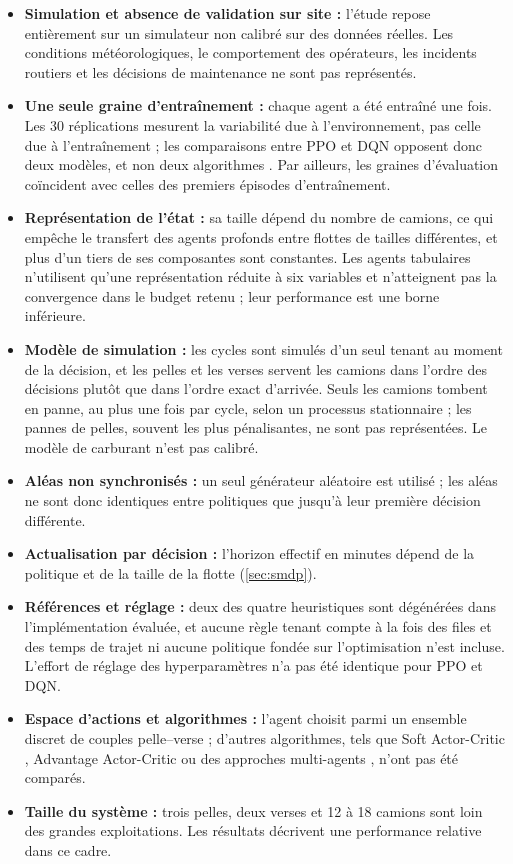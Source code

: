 \documentclass[11pt,a4paper]{article}
\newif\ifrevmarks
\newcommand{\revtag}[1]{\ifrevmarks\textsuperscript{\textcolor{red!70!black}{\scriptsize[#1]}}\fi}
\newenvironment{revbloc}[1]{\par\ifrevmarks\color{revcolor}\noindent\revtag{#1}\ \fi}{\par}
\begin{document}
\begin{revbloc}{M7, M8, M9, M11, M12, M25, N1--N5}
\begin{itemize}
  \item \textbf{Simulation et absence de validation sur site :} l'étude repose entièrement sur un simulateur non calibré sur des données réelles. Les conditions météorologiques, le comportement des opérateurs, les incidents routiers et les décisions de maintenance ne sont pas représentés.
  \item \textbf{Une seule graine d'entraînement :} chaque agent a été entraîné une fois. Les 30 réplications mesurent la variabilité due à l'environnement, pas celle due à l'entraînement ; les comparaisons entre PPO et DQN opposent donc deux modèles, et non deux algorithmes \cite{Henderson2018, Agarwal2021}. Par ailleurs, les graines d'évaluation coïncident avec celles des premiers épisodes d'entraînement.
  \item \textbf{Représentation de l'état :} sa taille dépend du nombre de camions, ce qui empêche le transfert des agents profonds entre flottes de tailles différentes, et plus d'un tiers de ses composantes sont constantes. Les agents tabulaires n'utilisent qu'une représentation réduite à six variables et n'atteignent pas la convergence dans le budget retenu ; leur performance est une borne inférieure.
  \item \textbf{Modèle de simulation :} les cycles sont simulés d'un seul tenant au moment de la décision, et les pelles et les verses servent les camions dans l'ordre des décisions plutôt que dans l'ordre exact d'arrivée. Seuls les camions tombent en panne, au plus une fois par cycle, selon un processus stationnaire ; les pannes de pelles, souvent les plus pénalisantes, ne sont pas représentées. Le modèle de carburant n'est pas calibré.
  \item \textbf{Aléas non synchronisés :} un seul générateur aléatoire est utilisé ; les aléas ne sont donc identiques entre politiques que jusqu'à leur première décision différente.
  \item \textbf{Actualisation par décision :} l'horizon effectif en minutes dépend de la politique et de la taille de la flotte (\cref{sec:smdp}).
  \item \textbf{Références et réglage :} deux des quatre heuristiques sont dégénérées dans l'implémentation évaluée, et aucune règle tenant compte à la fois des files et des temps de trajet ni aucune politique fondée sur l'optimisation n'est incluse. L'effort de réglage des hyperparamètres n'a pas été identique pour PPO et DQN.
  \item \textbf{Espace d'actions et algorithmes :} l'agent choisit parmi un ensemble discret de couples pelle--verse ; d'autres algorithmes, tels que Soft Actor-Critic \cite{Haarnoja2018, SampsonNwachukwu2025}, Advantage Actor-Critic ou des approches multi-agents \cite{Zhao2025}, n'ont pas été comparés.
  \item \textbf{Taille du système :} trois pelles, deux verses et 12 à 18 camions sont loin des grandes exploitations. Les résultats décrivent une performance relative dans ce cadre.
\end{itemize}
\end{revbloc}
\end{document}

